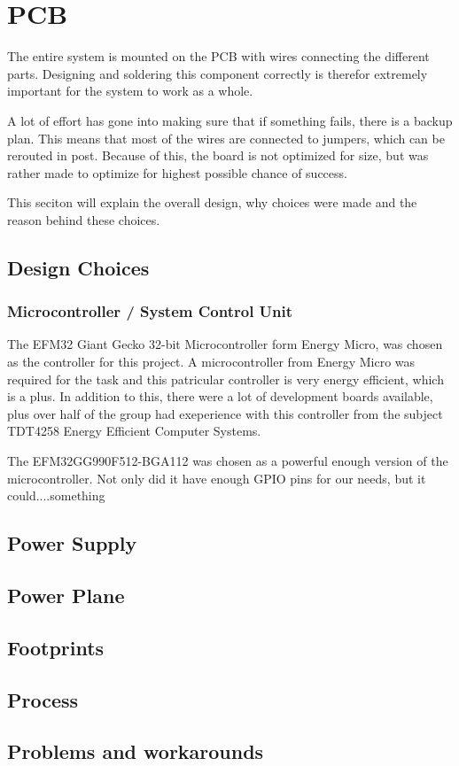 \section{PCB}
\label{sec:pcb}

The entire system is mounted on the PCB with wires connecting the different parts.
Designing and soldering this component correctly is therefor extremely important for the system
to work as a whole.

A lot of effort has gone into making sure that if something fails, there is a backup plan.
This means that most of the wires are connected to jumpers, which can be rerouted in post.
Because of this, the board is not optimized for size, but was rather made to optimize for
highest possible chance of success.

This seciton will explain the overall design, why choices were made and the reason behind these choices.

\subsection{Design Choices}
\label{sec:pcb:design}

\subsubsection{Microcontroller / System Control Unit}
The EFM32 Giant Gecko 32-bit Microcontroller form Energy Micro, was chosen as the controller for this project.
A microcontroller from Energy Micro was required for the task and this patricular controller is
very energy efficient, which is a plus.
In addition to this, there were a lot of development boards available,
plus over half of the group had exeperience with this controller from the subject
TDT4258 Energy Efficient Computer Systems.

The EFM32GG990F512-BGA112 was chosen as a powerful enough version of the microcontroller.
Not only did it have enough GPIO pins for our needs, but it could....something %

\subsection{Power Supply}

\subsection{Power Plane}

\subsection{Footprints}

\subsection{Process}

\subsection{Problems and workarounds}
